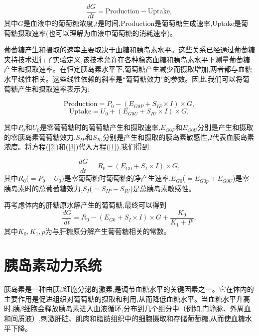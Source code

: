 \begin{equation}\label{1}
    \frac{dG}{dt} = \text{Production} - \text{Uptake},
\end{equation}
其中$G$是血液中的葡萄糖浓度,$t$是时间,Production是葡萄糖生成速率,Uptake是葡萄糖摄取速率(也可以理解为血液中葡萄糖的消耗速率)。

葡萄糖产生和摄取的速率主要取决于血糖和胰岛素水平。这些关系已经通过葡萄糖夹持技术进行了实验定义,该技术允许在各种稳态血糖和胰岛素水平下测量葡萄糖产生和摄取速率\cite{bergman1985assessment}。在恒定胰岛素水平下,葡萄糖产生减少而摄取增加,两者都与血糖水平线性相关\cite{best1981glucose}。这些线性依赖的斜率是“葡萄糖效力”的参数。因此,我们可以将葡萄糖产生和摄取速率表示为:

\begin{equation}\label{2}
    \text{Production} = P_0 -(E_{G0P} + S_{IP} \times I) \times G,
\end{equation}
\begin{equation}\label{3}
    \text{Uptake} = U_0 + (E_{G0U} + S_{IU} \times I) \times G,
\end{equation}

其中$P_0$和$U_0$是零葡萄糖时的葡萄糖产生和摄取速率,\(E_{G0P}\)和\(E_{G0U}\)分别是产生和摄取的零胰岛素葡萄糖效力,\(S_{IP}\)和\(S_{IU}\)分别是产生和摄取的胰岛素敏感性,$I$代表血胰岛素浓度。将方程(\ref{2})和(\ref{3})代入方程(\ref{1}),我们得到

\begin{equation}
    \frac{dG}{dt} = R_0 -(E_{G0} + S_I \times I) \times G,
\end{equation}
其中$R_0$($=P_0-U_0$)是零葡萄糖时葡萄糖的净产生速率,\(E_{G0}\)($=E_{G0p}+E_{G0U}$)是零胰岛素时的总葡萄糖效力,\(S_I\)($=S_{IP}-S_{IU}$)是总胰岛素敏感性\cite{topp2000model}。

再考虑体内的肝糖原水解产生的葡萄糖,最终可以得到
\begin{equation}
    \frac{dG}{dt} = R_0 -(E_{G0} + S_I \times I) \times G+\frac{K_0}{K_1+I^p},
\end{equation}
其中$K_0,K_1,p$为与肝糖原分解产生葡萄糖相关的常数\cite{bridgewater2020amplitude}。
\section{胰岛素动力系统}
胰岛素是一种由胰$\beta$细胞分泌的激素,是调节血糖水平的关键因素之一。它在体内的主要作用是促进组织对葡萄糖的摄取和利用,从而降低血糖水平。当血糖水平升高时,胰$\beta$细胞会释放胰岛素进入血液循环,分布到几个组分中（例如,门静脉、外周血和间质液）,刺激肝脏、肌肉和脂肪组织中的细胞摄取和存储葡萄糖,从而使血糖水平下降。

